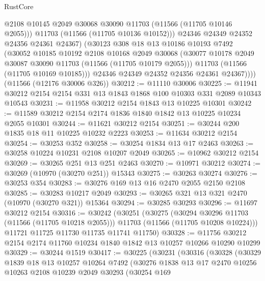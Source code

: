 \begin{lexlean}{RustCore}
\begin{coremodule}
                @2108
                @10145
                @2049
                @30068
                @30090
                @11703
                (@11566 (@11705 @10146 @2055)))
              @11703
              (@11566 (@11705 @10136 @10152)))
            @24346
            @24349
            @24352
            @24356
            @24361
            @24367)
          (@30123
            @308
            @18
            @13
            @10186
            @10193
            @7492
            (@30052
              @10185
              @10192
              @2108
              @10168
              @2049
              @30068
              (@30077 @10178 @2049 @30087 @30090 @11703 (@11566 (@11705 @10179 @2055)))
              @11703
              (@11566 (@11705 @10169 @10185)))
            @24346
            @24349
            @24352
            @24356
            @24361
            @24367))))
    (@11566 (@12176 @30006 @326))
@30212 := @11110 @30006
@30225 := @11941 @30212 @2154 @2154 @331 @13 @1843 @1868 @100 @10303 @331 @2089 @10343 @10543
@30231 := @11958 @30212 @2154 @1843 @13 @10225 @10301
@30242 := @11589 @30212 @2154 @2174 @1836 @1840 @1842 @13 @10225 @10234 @2055 @10301
@30244 := @11621 @30212 @2154
@30251 := @30244 @200 @1835 @18 @11 @10225 @10232 @2223
@30253 := @11634 @30212 @2154
@30254 := @30253 @352
@30258 := @30254 @1834 @13 @17 @2463
@30263 := @30258 @10224 @10231 @2108 @10207 @2049
@30265 := @10962 @30212 @2154
@30269 := @30265 @251 @13 @251 @2463
@30270 := @10971 @30212
@30274 := @30269 (@10970 (@30270 @251)) @15343
@30275 := @30263 @30274
@30276 := @30253 @354
@30283 := @30276 @169 @13 @16 @2470 @2055 @2150 @2108
@30285 := @30283 @10217 @2049
@30293 := @30265 @321 @13 @321 @2470 (@10970 (@30270 @321)) @15364
@30294 := @30285 @30293
@30296 := @11697 @30212 @2154
@30316 := @30242
    (@30251
      (@30275
        (@30294 @30296 @11703 (@11566 (@11705 @10218 @2055)))
        @11703
        (@11566 (@11705 @10208 @10224)))
      @11721
      @11725
      @11730
      @11735
      @11741
      @11750)
@30328 := @11756 @30212 @2154 @2174 @11760 @10234 @1840 @1842 @13 @10257 @10266 @10290 @10299
@30329 := @30244 @1519
@30417 := @30225
    (@30231
      (@30316
        (@30328
          (@30329
            @1839
            @18
            @13
            @10257
            @10264
            @7492
            (@30276
              @1838
              @13
              @17
              @2470
              @10256
              @10263
              @2108
              @10239
              @2049
              @30293
              (@30254
                @169

\end{coremodule}
\end{lexlean}
